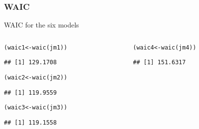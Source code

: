 \documentclass[color=usenames,dvipsnames]{beamer}\usepackage[]{graphicx}\usepackage[]{color}
\makeatletter
\newcommand{\hlstd}[1]{\textcolor[rgb]{0,0,0}{#1}}%
\newcommand{\hlkwb}[1]{\textcolor[rgb]{0,0.341,0.682}{#1}}%
\newcommand{\hlkwd}[1]{\textcolor[rgb]{0.004,0.004,0.506}{#1}}%
\newenvironment{kframe}{%
 \def\at@end@of@kframe{}%
 \ifinner\ifhmode%
  \def\at@end@of@kframe{\end{minipage}}%
  \begin{minipage}{\columnwidth}%
 \fi\fi%
 \def\FrameCommand##1{\hskip\@totalleftmargin \hskip-\fboxsep
 \colorbox{shadecolor}{##1}\hskip-\fboxsep
     \hskip-\linewidth \hskip-\@totalleftmargin \hskip\columnwidth}%
 \MakeFramed {\advance\hsize-\width
   \@totalleftmargin\z@ \linewidth\hsize
   \@setminipage}}%
 {\par\unskip\endMakeFramed%
 \at@end@of@kframe}
\newenvironment{knitrout}{}{} %
\makeatother
\begin{document}
\begin{frame}[fragile]
  \frametitle{WAIC}
  WAIC for the six models
  \begin{columns}
    \begin{column}{0.5\textwidth}
\begin{knitrout}\scriptsize
{}\color{fgcolor}\begin{kframe}
\begin{alltt}
\hlstd{(waic1} \hlkwb{<-} \hlkwd{waic}\hlstd{(jm1))}
\end{alltt}
\begin{verbatim}
## [1] 129.1708
\end{verbatim}
\end{kframe}
\end{knitrout}
\begin{knitrout}\scriptsize
{}\color{fgcolor}\begin{kframe}
\begin{alltt}
\hlstd{(waic2} \hlkwb{<-} \hlkwd{waic}\hlstd{(jm2))}
\end{alltt}
\begin{verbatim}
## [1] 119.9559
\end{verbatim}
\end{kframe}
\end{knitrout}
\begin{knitrout}\scriptsize
{}\color{fgcolor}\begin{kframe}
\begin{alltt}
\hlstd{(waic3} \hlkwb{<-} \hlkwd{waic}\hlstd{(jm3))}
\end{alltt}
\begin{verbatim}
## [1] 119.1558
\end{verbatim}
\end{kframe}
\end{knitrout}
    \end{column}
    \begin{column}{0.5\textwidth}
\begin{knitrout}\scriptsize
{}\color{fgcolor}\begin{kframe}
\begin{alltt}
\hlstd{(waic4} \hlkwb{<-} \hlkwd{waic}\hlstd{(jm4))}
\end{alltt}
\begin{verbatim}
## [1] 151.6317
\end{verbatim}
\end{kframe}

\end{knitrout}
\end{column}
\end{columns}
\end{frame}
\end{document}
